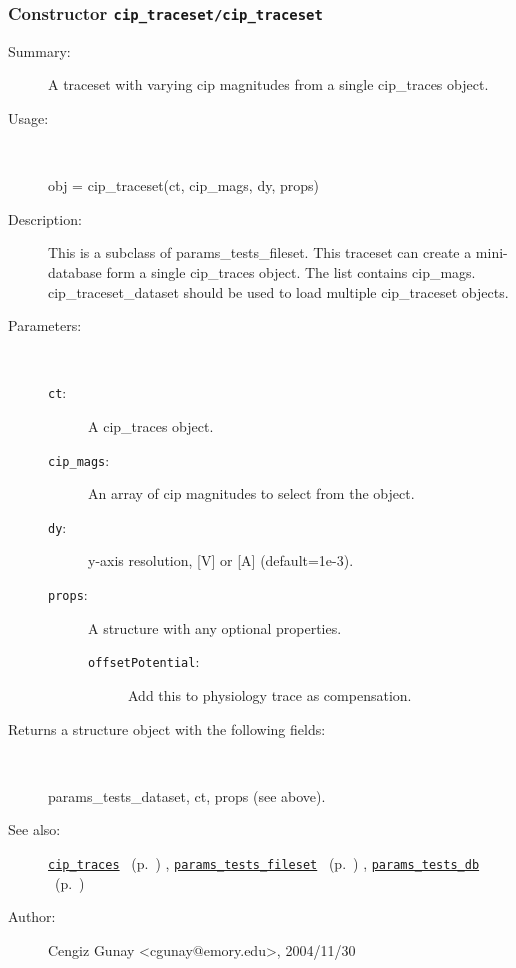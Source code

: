 \subsubsection[Constructor \texttt{cip\_traceset}]{Constructor \texttt{cip\_traceset/cip\_traceset}}%
%
\label{ref_cip_traceset__cip_traceset}%
\hypertarget{ref_cip_traceset__cip_traceset}{}%
\begin{description}
\item[Summary:]A traceset with varying cip magnitudes from a single cip\_traces object.
%
\item[Usage:]~%
\begin{lyxcode}%
obj = cip\_traceset(ct, cip\_mags, dy, props)
%
\end{lyxcode}%
%
\item[Description:]%
This is a subclass of params\_tests\_fileset. This traceset can create a 
 mini-database form a single cip\_traces object. The list contains cip\_mags.
 cip\_traceset\_dataset should be used to load multiple cip\_traceset objects.
\item[Parameters:]~
\begin{description}%
\item[\texttt{ct}:]
 A cip\_traces object.
\item[\texttt{cip\_mags}:]
 An array of cip magnitudes to select from the object.
\item[\texttt{dy}:]
 y-axis resolution, [V] or [A] (default=1e-3).
\item[\texttt{props}:]
 A structure with any optional properties.
\begin{description}%
\item[\texttt{offsetPotential}:]
 Add this to physiology trace as compensation.
\end{description}%
\end{description}%
%
\item[Returns a structure object with the following fields:]~

	params\_tests\_dataset,
	ct, props (see above).
%
%
\item[See also:]%
\hyperlink{ref_cip_traces}{\texttt{cip\_traces}}%
\ (p.~\pageref{ref_cip_traces})%
%
, \hyperlink{ref_params_tests_fileset}{\texttt{params\_tests\_fileset}}%
\ (p.~\pageref{ref_params_tests_fileset})%
%
, \hyperlink{ref_params_tests_db}{\texttt{params\_tests\_db}}%
\ (p.~\pageref{ref_params_tests_db})%
%
%
\item[Author:]%
Cengiz Gunay <cgunay@emory.edu>, 2004/11/30%
\end{description}
\methodline%
